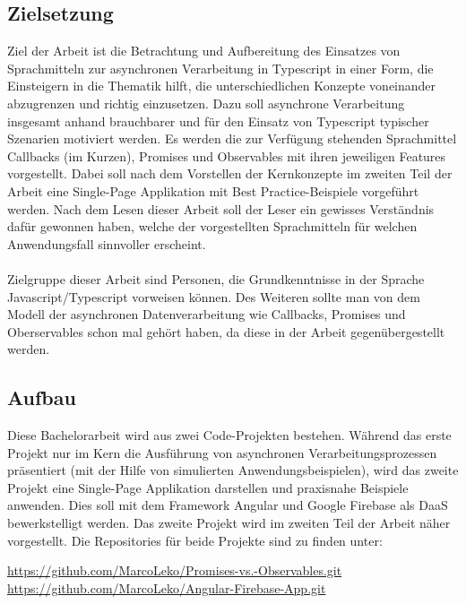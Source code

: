 \subsection{Zielsetzung}

Ziel der Arbeit ist die Betrachtung und Aufbereitung des Einsatzes von Sprachmitteln zur asynchronen Verarbeitung in Typescript in einer Form, die Einsteigern in die Thematik hilft, die unterschiedlichen Konzepte voneinander abzugrenzen und richtig einzusetzen. Dazu soll asynchrone Verarbeitung insgesamt anhand brauchbarer und für den Einsatz von Typescript typischer Szenarien motiviert werden. Es werden die zur Verfügung stehenden Sprachmittel Callbacks (im Kurzen), Promises und Observables mit ihren jeweiligen Features vorgestellt. Dabei soll nach dem Vorstellen der Kernkonzepte im zweiten Teil der Arbeit eine Single-Page Applikation mit \glqq Best Practice\grqq{}-Beispiele vorgeführt werden. Nach dem Lesen dieser Arbeit soll der Leser ein gewisses Verständnis dafür gewonnen haben, welche der vorgestellten Sprachmitteln für welchen Anwendungsfall sinnvoller erscheint.\\\\

\noindent
Zielgruppe dieser Arbeit sind Personen, die Grundkenntnisse in der Sprache Javascript/Typescript vorweisen können. Des Weiteren sollte man von dem Modell der asynchronen Datenverarbeitung wie Callbacks, Promises und Oberservables schon mal gehört haben, da diese in der Arbeit gegenübergestellt werden.

\subsection{Aufbau}

Diese Bachelorarbeit wird aus zwei Code-Projekten bestehen. Während das erste Projekt nur im Kern die Ausführung von asynchronen Verarbeitungsprozessen präsentiert (mit der Hilfe von simulierten Anwendungsbeispielen), wird das zweite Projekt eine Single-Page Applikation darstellen und praxisnahe Beispiele anwenden. Dies soll mit dem Framework Angular und Google Firebase als DaaS bewerkstelligt werden. Das zweite Projekt wird im zweiten Teil der Arbeit näher vorgestellt. Die Repositories für beide Projekte sind zu finden unter: 

\begin{center}
\url{https://github.com/MarcoLeko/Promises-vs.-Observables.git} \\
\url{https://github.com/MarcoLeko/Angular-Firebase-App.git}
\end{center}

